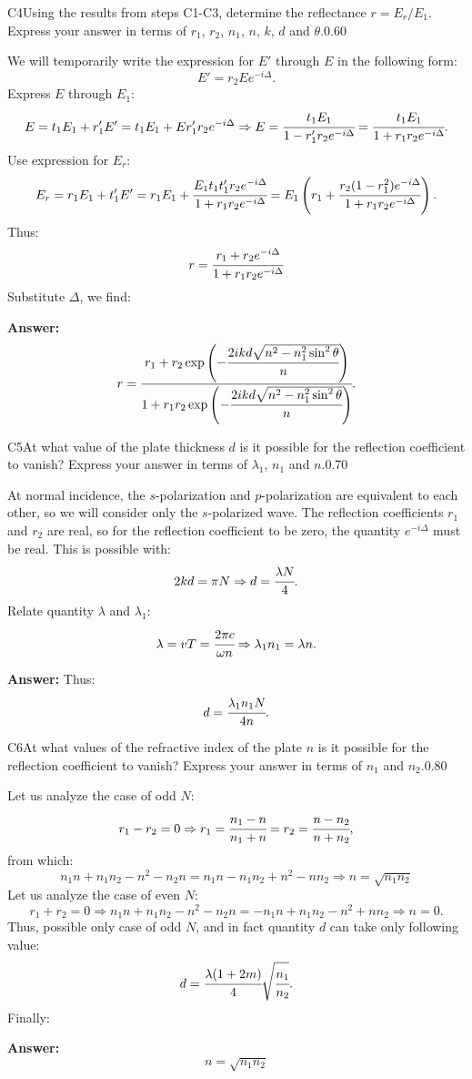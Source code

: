 \documentclass[11pt,a4paper]{article}
\begin{document}
\begin{solcard}{C4}{Using the results from steps C1-C3, determine the reflectance $r=E_r/E_1$. Express your answer in terms of $r_1$, $r_2$, $n_1$, $n$, $k$, $d$ and $\theta$.}{0.60}

We will temporarily write the expression for $E'$ through $E$ in the following form: $$E'=r_2Ee^{-i\Delta}{.} $$Express $E$ through $E_1$: $$E=t_1E_1+r'_1E'=t_1E_1+Er'_1r_2e^{-i\Delta}\Rightarrow E=\cfrac{t_1E_1}{1-r'_1r_2e^{-i\Delta}}=\cfrac{t_1E_1}{1+r_1r_2e^{-i\Delta}}{.} $$Use expression for $E_r$: $$E_r=r_1E_1+t'_1E'=r_1E_1+\cfrac{E_1t_1t'_1r_2e^{-i\Delta}}{1+r_1r_2e^{-i\Delta}}=E_1\left(r_1+\cfrac{r_2(1-r^2_1)e^{-i\Delta}}{1+r_1r_2e^{-i\Delta}}\right){.} $$Thus: $$r=\cfrac{r_1+r_2e^{-i\Delta}}{1+r_1r_2e^{-i\Delta}} $$Substitute $\Delta$, we find:

\par\smallskip\noindent\textbf{Answer:} $$r=\cfrac{r_1+r_2\exp\left(-\cfrac{2ikd\sqrt{n^2-n^2_1\sin^2\theta}}{n}\right)}{1+r_1r_2\exp\left(-\cfrac{2ikd\sqrt{n^2-n^2_1\sin^2\theta}}{n}\right)}{.} $$
\end{solcard}

\begin{solcard}{C5}{At what value of the plate thickness $d$ is it possible for the reflection coefficient to vanish? Express your answer in terms of $\lambda_1$, $n_1$ and $n$.}{0.70}

At normal incidence, the $s$-polarization and $p$-polarization are equivalent to each other, so we will consider only the $s$-polarized wave. The reflection coefficients $r_1$ and $r_2$ are real, so for the reflection coefficient to be zero, the quantity $e^{-i\Delta}$ must be real. This is possible with: $$2kd=\pi N\Rightarrow d=\cfrac{\lambda N}{4}{.} $$Relate quantity $\lambda$ and $\lambda_1$: $$\lambda=vT=\cfrac{2\pi c}{\omega n}\Rightarrow \lambda_1n_1=\lambda n{.} $$

\par\smallskip\noindent\textbf{Answer:} Thus: $$d=\cfrac{\lambda_1n_1N}{4n}{.} $$
\end{solcard}

\begin{solcard}{C6}{At what values of the refractive index of the plate $n$ is it possible for the reflection coefficient to vanish? Express your answer in terms of $n_1$ and $n_2$.}{0.80}

Let us analyze the case of odd $N$: $$r_1-r_2=0\Rightarrow r_1=\cfrac{n_1-n}{n_1+n}=r_2=\cfrac{n-n_2}{n+n_2}{,} $$from which: $$n_1n+n_1n_2-n^2-n_2n=n_1n-n_1n_2+n^2-nn_2\Rightarrow n=\sqrt{n_1n_2} $$Let us analyze the case of even $N$: $$r_1+r_2=0\Rightarrow n_1n+n_1n_2-n^2-n_2n=-n_1n+n_1n_2-n^2+nn_2\Rightarrow n=0{.} $$Thus, possible only case of odd $N$, and in fact quantity $d$ can take only following value: $$d=\cfrac{\lambda(1+2m)}{4}\sqrt{\cfrac{n_1}{n_2}}{.} $$Finally:

\par\smallskip\noindent\textbf{Answer:} $$n=\sqrt{n_1n_2} $$
\end{solcard}
\end{document}
